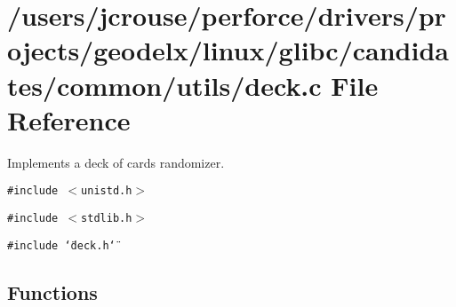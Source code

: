 \section{/users/jcrouse/perforce/drivers/projects/geodelx/linux/glibc/candidates/common/utils/deck.c File Reference}
\label{deck_8c}
Implements a deck of cards randomizer. 


{\tt \#include $<$unistd.h$>$}\par
{\tt \#include $<$stdlib.h$>$}\par
{\tt \#include \char`\"{}deck.h\char`\"{}}\par
\subsection*{Functions}
